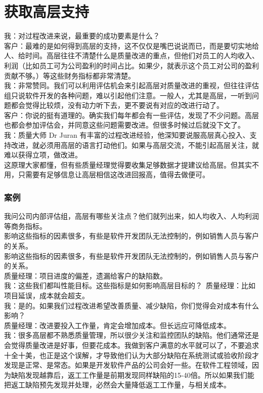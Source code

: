 \chapter{获取高层支持} %


我：对过程改进来说，最重要的成功要素是什么？\\
客户：最难的是如何得到高层的支持，这不仅仅是嘴巴说说而已，而是要切实地给人、给时间。高层往往不清楚什么是质量改进的重点，但他们对员工的人均收入、利润（比如员工可为公司盈利的时间占比。如果少，就表示这个员工对公司的盈利贡献不够。）等这些财务指标都非常清楚。\\
我：非常赞同。我们可以利用评估机会来引起高层对质量改进的重视，但往往评估组只说软件开发的各种问题，难以引起他们注意。一般人，尤其是高层，一听到问题都会觉得比较烦，没有动力听下去，更不要说有对应的改进行动了。\\
客户：你说的挺有道理的。确实我们每年都会有一些评估，发现了不少问题。高层也都会参加评估会，并同意这些问题需要改进。但很多时候过后就没下文了。\\
我：质量大师 Dr Juran 有丰富的过程改进经验，他深知要说服高层真心投入、支持改进，就必须用高层的语言打动他们。如果与高层交流，不能引起高层关注，就难以获得立项，做改进。\\

这原理大家都懂，但有些质量经理觉得要收集足够数据才提建议给高层。但其实不用，只需要有足够信息让高层相信这改进回报高，值得去做便可。\\


\hypertarget{ux7b2cux4e00ux7248ux65b9ux6848ux4e66}{%
\subsection{案例}\label{ux7b2cux4e00ux7248ux65b9ux6848ux4e66}}

我问公司内部评估组，高层有哪些关注点？他们就列出来，如人均收入、人均利润等商务指标。\\
影响这些指标的因素很多，有些是软件开发团队无法控制的，例如销售人员与客户的关系。\\
影响这些指标的因素很多，有些是软件开发团队无法控制的，例如销售人员与客户的关系。\\
质量经理：项目进度的偏差，遗漏给客户的缺陷数。\\
我：这些我们都叫性能目标。这些指标是如何影响高层目标的？\
质量经理：比如项目延误，成本就会超支。\\
我：是的。如果我们过程改进希望改善质量、减少缺陷，你们觉得会对成本有什么影响？\\
质量经理：改进要投入工作量，肯定会增加成本。但长远应可降低成本。\\
我：很多高层都不熟悉质量管理，所以很少关注和监控团队的缺陷。他们通常还是会觉得质量改进是好事，但要花成本。我做到客户满意的水平就可以了，不要追求十全十美，也正是这个误解，才导致他们认为大部分缺陷在系统测试或验收阶段才发现是正常、是常态。如果是开发软件产品的公司会好一些。在软件工程领域，因为缺陷发现越靠后，返工工作量是前期发现同样缺陷的15-40倍。所以如果我们能把返工缺陷预先发现并处理，必然会大量降低返工工作量，与相关成本。\\

